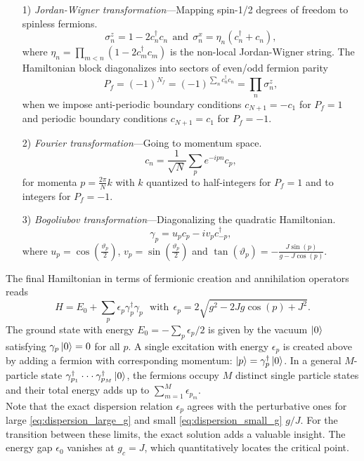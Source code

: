 \begin{enumerate}
	\item[1)] \textit{Jordan-Wigner transformation}---Mapping spin-1/2 degrees of freedom to spinless fermions.
	\begin{equation}
		\sigma^z_n = 1 - 2c_n^{\dagger}c_n \:\: \text{and} \:\: \sigma^x_n = \eta_n (c_n^{\dagger} + c_n),
	\end{equation}
	where $\eta_n = \prod_{m<n}(1-2c_m^{\dagger}c_m)$ is the non-local Jordan-Wigner string. The Hamiltonian block diagonalizes into sectors of even/odd fermion parity
\begin{equation}
	P_f = (-1)^{N_f} = (-1)^{\sum_n c_n^{\dagger} c_n} = \prod_n \sigma^z_n,
\end{equation}
when we impose anti-periodic boundary conditions $c_{N+1} = -c_1$ for $P_f = 1$ and periodic boundary conditions $c_{N+1} = c_1$ for $P_f = -1$.	
	\item[2)] \textit{Fourier transformation}---Going to momentum space.
	\begin{equation}
		c_n = \frac{1}{\sqrt{N}}\sum_p e^{-ipn}c_p,
	\end{equation}
	for momenta $p = \frac{2 \pi}{N}k$ with $k$ quantized to half-integers for $P_f = 1$ and to integers for $P_f = -1$.
	
	\item[3)] \textit{Bogoliubov transformation}---Diagonalizing the quadratic Hamiltonian.
	\begin{equation}
		\gamma_p = u_p c_p - i v_p c_{-p}^{\dagger},
	\end{equation}
	where $u_p = \cos(\frac{\vartheta_p}{2})$, $v_p = \sin(\frac{\vartheta_p}{2})$ and $\tan(\vartheta_p) = -\frac{J\sin(p)}{g - J\cos(p)}$. \\
\end{enumerate}

\noindent The final Hamiltonian in terms of fermionic creation and annihilation operators reads
\begin{equation}
	H = E_0 + \sum_p \epsilon_p \gamma_p^{\dagger} \gamma_p \:\:\: \text{with} \:\: \epsilon_p = 2\sqrt{g^2 - 2 J g \cos(p) + J^2}.
\end{equation}
The ground state with energy $E_0 = - \sum_p \epsilon_p/2$ is given by the vacuum $\ket{0}$ satisfying $\gamma_p \ket{0} = 0$ for all $p$. A single excitation with energy $\epsilon_p$ is created above by adding a fermion with corresponding momentum: $\ket{p} = \gamma_p^{\dagger} \ket{0}$. In a general $M$-particle state $\gamma_{p_1}^{\dagger} \cdot\cdot\cdot \gamma_{p_M}^{\dagger} \ket{0}$, the fermions occupy $M$ distinct single particle states and their total energy adds up to $\sum_{m=1}^M \epsilon_{p_m}$. \\

\noindent Note that the exact dispersion relation $\epsilon_p$ agrees with the perturbative ones for large \eqref{eq:dispersion_large_g} and small \eqref{eq:dispersion_small_g} $g/J$. For the transition between these limits, the exact solution adds a valuable insight. The energy gap $\epsilon_0$ vanishes at $g_c = J$, which quantitatively locates the critical point.